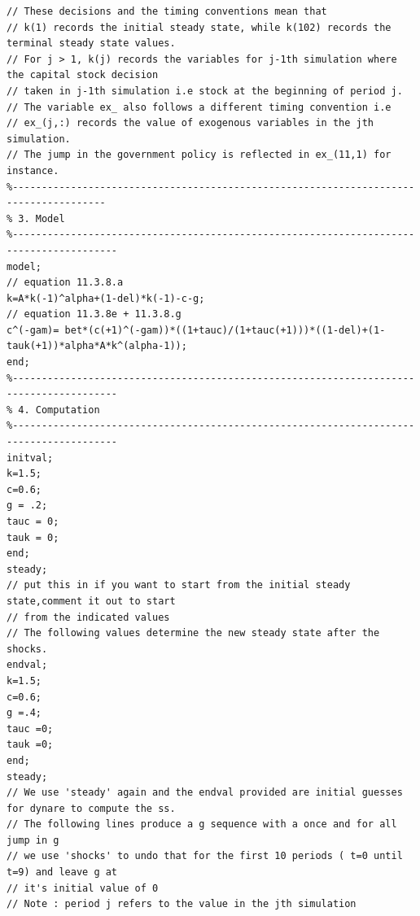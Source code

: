 \documentclass[10pt]{article}
\begin{document}
\begin{verbatim}
// These decisions and the timing conventions mean that
// k(1) records the initial steady state, while k(102) records the terminal steady state values.
// For j > 1, k(j) records the variables for j-1th simulation where the capital stock decision
// taken in j-1th simulation i.e stock at the beginning of period j.
// The variable ex_ also follows a different timing convention i.e
// ex_(j,:) records the value of exogenous variables in the jth simulation.
// The jump in the government policy is reflected in ex_(11,1) for instance.
%--------------------------------------------------------------------------------------
% 3. Model
%----------------------------------------------------------------------------------------
model;
// equation 11.3.8.a
k=A*k(-1)^alpha+(1-del)*k(-1)-c-g;
// equation 11.3.8e + 11.3.8.g
c^(-gam)= bet*(c(+1)^(-gam))*((1+tauc)/(1+tauc(+1)))*((1-del)+(1-tauk(+1))*alpha*A*k^(alpha-1));
end;
%----------------------------------------------------------------------------------------
% 4. Computation
%----------------------------------------------------------------------------------------
initval;
k=1.5;
c=0.6;
g = .2;
tauc = 0;
tauk = 0;
end;
steady;
// put this in if you want to start from the initial steady state,comment it out to start
// from the indicated values
// The following values determine the new steady state after the shocks.
endval;
k=1.5;
c=0.6;
g =.4;
tauc =0;
tauk =0;
end;
steady;
// We use 'steady' again and the endval provided are initial guesses for dynare to compute the ss.
// The following lines produce a g sequence with a once and for all jump in g
// we use 'shocks' to undo that for the first 10 periods ( t=0 until t=9) and leave g at
// it's initial value of 0
// Note : period j refers to the value in the jth simulation
\end{verbatim}
\end{document}
